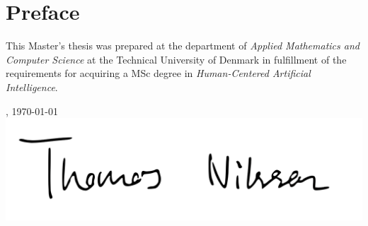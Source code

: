 \chapter{Preface}
This Master's thesis was prepared at the department of \textit{Applied Mathematics and Computer Science} at the Technical University of Denmark in fulfillment of the requirements for acquiring a MSc degree in \textit{Human-Centered Artificial Intelligence}.

\vfill

{
\centering
    \thesislocation{}, \today\\[1cm]
    \hspace{3cm}\includegraphics[scale=0.4]{graphics/signature.png}\\[1cm]
\begin{flushright}
    \thesisauthor{}
\end{flushright}
}